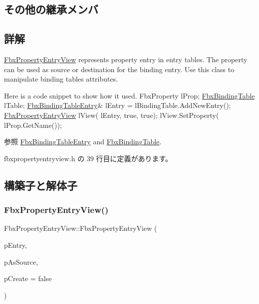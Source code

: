 \subsection*{その他の継承メンバ}


\subsection{詳解}
\hyperlink{class_fbx_property_entry_view}{Fbx\+Property\+Entry\+View} represents property entry in entry tables. The property can be used as source or destination for the binding entry. Use this class to manipulate binding table\textquotesingle{}s attributes.


\begin{DoxyCode}
 Here is a code snippet to show how it used.
FbxProperty lProp;
\hyperlink{class_fbx_binding_table}{FbxBindingTable} lTable;
\hyperlink{class_fbx_binding_table_entry}{FbxBindingTableEntry}& lEntry = lBindingTable.AddNewEntry();
\hyperlink{class_fbx_property_entry_view}{FbxPropertyEntryView} lView( lEntry, \textcolor{keyword}{true}, \textcolor{keyword}{true});
lView.SetProperty( lProp.GetName());
\end{DoxyCode}


\begin{DoxySeeAlso}{参照}
\hyperlink{class_fbx_binding_table_entry}{Fbx\+Binding\+Table\+Entry} and \hyperlink{class_fbx_binding_table}{Fbx\+Binding\+Table}. 
\end{DoxySeeAlso}


 fbxpropertyentryview.\+h の 39 行目に定義があります。



\subsection{構築子と解体子}
\mbox{\label{class_fbx_property_entry_view_ac1d9bbc86521ef0f3d8a1761568bc19c}} 
\subsubsection{\texorpdfstring{Fbx\+Property\+Entry\+View()}{FbxPropertyEntryView()}}
{\footnotesize\ttfamily Fbx\+Property\+Entry\+View\+::\+Fbx\+Property\+Entry\+View (\begin{DoxyParamCaption}\item[{\hyperlink{class_fbx_binding_table_entry}{Fbx\+Binding\+Table\+Entry} $\ast$}]{p\+Entry,  }\item[{bool}]{p\+As\+Source,  }\item[{bool}]{p\+Create = {\ttfamily false} }\end{DoxyParamCaption})}

